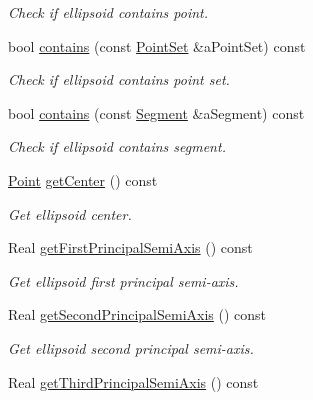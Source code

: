 \begin{DoxyCompactItemize}
\begin{DoxyCompactList}\small\item\em Check if ellipsoid contains point. \end{DoxyCompactList}\item 
bool \hyperlink{classostk_1_1math_1_1geom_1_1d3_1_1objects_1_1_ellipsoid_a9e0b0c5c2db95f53da783ccfea36de17}{contains} (const \hyperlink{classostk_1_1math_1_1geom_1_1d3_1_1objects_1_1_point_set}{Point\+Set} \&a\+Point\+Set) const
\begin{DoxyCompactList}\small\item\em Check if ellipsoid contains point set. \end{DoxyCompactList}\item 
bool \hyperlink{classostk_1_1math_1_1geom_1_1d3_1_1objects_1_1_ellipsoid_afcb41440d899c60766cdc7e9c838c55d}{contains} (const \hyperlink{classostk_1_1math_1_1geom_1_1d3_1_1objects_1_1_segment}{Segment} \&a\+Segment) const
\begin{DoxyCompactList}\small\item\em Check if ellipsoid contains segment. \end{DoxyCompactList}\item 
\hyperlink{classostk_1_1math_1_1geom_1_1d3_1_1objects_1_1_point}{Point} \hyperlink{classostk_1_1math_1_1geom_1_1d3_1_1objects_1_1_ellipsoid_a0b1f86eb5b3cb20a8306a951a6006d4e}{get\+Center} () const
\begin{DoxyCompactList}\small\item\em Get ellipsoid center. \end{DoxyCompactList}\item 
Real \hyperlink{classostk_1_1math_1_1geom_1_1d3_1_1objects_1_1_ellipsoid_a0d922209dffb806def71604d7dde2ba7}{get\+First\+Principal\+Semi\+Axis} () const
\begin{DoxyCompactList}\small\item\em Get ellipsoid first principal semi-\/axis. \end{DoxyCompactList}\item 
Real \hyperlink{classostk_1_1math_1_1geom_1_1d3_1_1objects_1_1_ellipsoid_a628df5e41c5b24722c74b54f604788da}{get\+Second\+Principal\+Semi\+Axis} () const
\begin{DoxyCompactList}\small\item\em Get ellipsoid second principal semi-\/axis. \end{DoxyCompactList}\item 
Real \hyperlink{classostk_1_1math_1_1geom_1_1d3_1_1objects_1_1_ellipsoid_aa0439388600dc3b6dc93d26402ae2d6d}{get\+Third\+Principal\+Semi\+Axis} () const

\end{DoxyCompactItemize}
